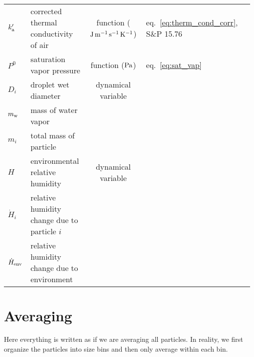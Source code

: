 \documentclass{article}
\begin{document}
\begin{tabular}{lp{4cm}clp{3cm}}
$k_{\rm a}'$        & corrected thermal conductivity of air              & function ($\rm J \, m^{-1} \, s^{-1} \, K^{-1}$)   & eq.~\ref{eq:therm_cond_corr}, S\&P 15.76  \\
$P^0$               & saturation vapor pressure                          & function ($\rm Pa$)                             & eq.~\ref{eq:sat_vap}                      \\
$D_i$               & droplet wet diameter                               & dynamical variable                              &                                           \\
$m_{\rm w}$         & mass of water vapor                                &                                                                                             \\
$m_{i}$             & total mass of particle                             &                                                                                             \\
$H$                 & environmental relative humidity                    & dynamical variable                              &                                           \\
$\dot{H}_i$         & relative humidity change due to particle $i$       &                                                 &                                           \\
$\dot{H}_{\rm env}$ & relative humidity change due to environment        &                                                 &                                           \\
\hline 
\end{tabular}

\newpage

\section{Averaging}

Here everything is written as if we are averaging all particles. In
reality, we first organize the particles into size bins and then only
average within each bin.
\end{document}

